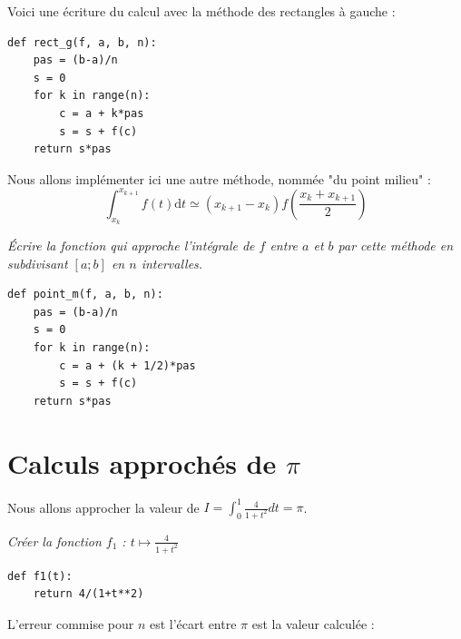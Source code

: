 Voici une écriture du calcul avec la méthode des rectangles à gauche :
\begin{lstlisting}
def rect_g(f, a, b, n):
    pas = (b-a)/n
    s = 0
    for k in range(n):
        c = a + k*pas
        s = s + f(c)
    return s*pas
\end{lstlisting}
\newpage
Nous allons implémenter ici une autre méthode, nommée "du point milieu" :
\[\int_{x_k}^{x_{k+1}} f(t) \text{d}t\simeq (x_{k+1} -x_k)f\left(\frac{x_k + x_{k+1}}2\right)\]
\begin{Exercise}[title ={Écriture}]\it
Écrire la fonction  qui approche l'intégrale de $f$ entre $a$ et $b$ par cette méthode en subdivisant $[a;b]$ en $n$ intervalles.
\end{Exercise}
\begin{Answer}
\begin{lstlisting}
def point_m(f, a, b, n):
    pas = (b-a)/n
    s = 0
    for k in range(n):
        c = a + (k + 1/2)*pas
        s = s + f(c)
    return s*pas
\end{lstlisting}
\end{Answer}
\section{Calculs approchés de $\pi$}
Nous allons approcher la valeur de $\displaystyle I = \int_0^1 \frac 4{1+t^2} dt=\pi$.
\begin{Exercise}\it
Créer la fonction $f_1$ : $\displaystyle t \mapsto \frac 4{1+t^2}$
\end{Exercise}
\begin{Answer}
\begin{lstlisting}
def f1(t):
    return 4/(1+t**2)
\end{lstlisting}
\end{Answer}
L'erreur commise pour $n$ est l'écart entre $\pi$ est la valeur calculée : 


